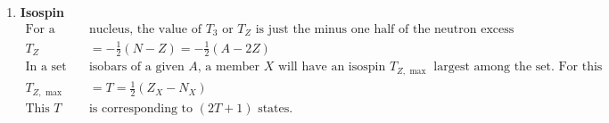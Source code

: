 \begin{enumerate}
\begin{align*}
Q_0&=\frac{1}{e}\int(3{Z^\prime}^2-{r^\prime}^2)\rho(r^\prime)d\tau^\prime
\intertext{Where integration is carried out over the entire volume of the nucleus. $r^\prime(x^\prime,y^\prime,z^\prime)$ is the distance measured from the center of mass of the nucleus.}
\text{For a spherically}&\text{ symmetric charge distribution.}\\
\rho(r^\prime){x^\prime}^2d\tau^\prime&=\int \rho(r^\prime){y^\prime}^2d\tau^\prime=\int \rho(r^\prime){z^\prime}^2d\tau^\prime=\frac{1}{3}\int \rho(r^\prime){r^\prime}^2d\tau^\prime\\
\text{Therefore $\theta_0$}&=\text{$0$for spherical nucleus.}\\
\text{For a nonsperical }&\text{nucleus $\theta$ and $\theta_0$ is related as,}\\
Q&=Q_0\left( \frac{I(2I-1)}{(I+1)(2I+3)}\right) \\
\text{Where $I$ is the total }&\text{angular momentum (spin)}\\
\text{If}\quad Q_0>0, &\int \rho(r^\prime){z^\prime}^2d\tau^\prime>\frac{1}{3}\int \rho(r^\prime){r^\prime}^2d\tau^\prime\\
\text{Such nucleus is eleongated }&\text{ along the $z^\prime$ axis (cigar shaped) is called prolate spheroid.}\\
\text{If}\quad Q_0<0, &\int \rho(r^\prime){z^\prime}^2d\tau^\prime<\frac{1}{3}\int \rho(r^\prime){r^\prime}^2d\tau^\prime\\
\text{Such nucleus is called }&\text{oblate spheroid (pancake shape)}
\end{align*}
\begin{figure}[H]
	\centering
	\texttt{[image: diagram-20220307(5)-crop]}
	\caption{}
	\label{}
\end{figure}
\item \textbf{Isospin}
\begin{align*}
\text{For a given }&\text{nucleus, the value of $T_3$ or $T_Z$ is just the minus one half of the neutron excess}\\
T_Z&=-\frac{1}{2}(N-Z)=-\frac{1}{2}(A-2 Z)\\
\text{In a set of }&\text{isobars of a given $A$, a member $X$ will have an isospin $T_{Z, \text { max }}$ largest among the set. For this}\\
T_{Z, \text { max }}&=T=\frac{1}{2}\left(Z_X-N_X\right)\\
\text{This $T$ }&\text{is corresponding to $(2 T+1)$ states.}\\

\end{align*}
\end{enumerate}

